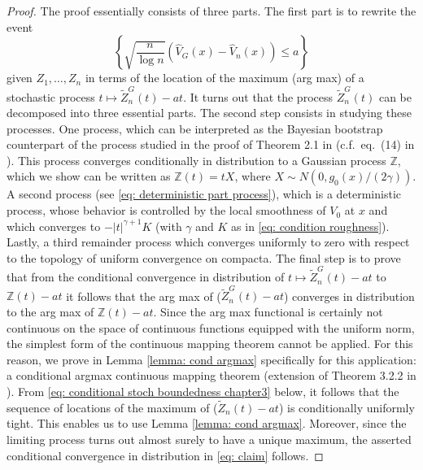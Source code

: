 \begin{proof}

The proof essentially consists of three parts. The first part is to rewrite the event
$$
\left\{\sqrt{\frac{n}{\log n}}\left(\hat{V}_{\scriptscriptstyle{G}}(x) - \hat{V}_n(x)\right) \leq a\right\}
$$
given $Z_1,\ldots,Z_n$ in terms of the location of the maximum (arg max) of a stochastic process $t \mapsto \tilde{Z}^{\scriptscriptstyle{G}}_n(t)-a t$. It turns out that the process $\tilde{Z}^{\scriptscriptstyle{G}}_n(t)$ can be decomposed into three essential parts. The second step consists in studying these processes. One process, which can be interpreted as the Bayesian bootstrap counterpart of the process studied in the proof of Theorem 2.1 in \cite{27} (c.f.\ eq.\ (14) in \cite{27}). This process converges conditionally in distribution to a Gaussian process $\mathbb{Z}$, which we show can be written as $\mathbb{Z}(t) = tX$, where $X \sim N(0,g_0(x)/(2\gamma))$. A second process (see \eqref{eq: deterministic part process}), which is a deterministic process, whose behavior is controlled by the local smoothness of $V_0$ at $x$ and which converges to $- |t|^{\gamma+1} K$ (with $\gamma$ and $K$ as in \eqref{eq: condition roughness}). Lastly, a third remainder process which converges uniformly to zero with respect to the topology of uniform convergence on compacta. The final step is to prove that from the conditional convergence in distribution of $t \mapsto \tilde{Z}^{\scriptscriptstyle{G}}_n(t)-a t$ to $\mathbb{Z}(t)-a t$ it follows that the arg max of ($\tilde{Z}^{\scriptscriptstyle{G}}_n(t)-a t$) converges in distribution to the arg max of $\mathbb{Z}(t)-a t$. Since the arg max functional is certainly not continuous on the space of continuous functions equipped with the uniform norm, the simplest form of the continuous mapping theorem cannot be applied. For this reason, we prove in Lemma \ref{lemma: cond argmax} specifically for this application: a conditional argmax continuous mapping theorem (extension of Theorem 3.2.2 in \cite{5}). From \eqref{eq: conditional stoch boundedness chapter3} below, it follows that the sequence of locations of the maximum of ($\tilde{Z}_n(t)-a t$) is conditionally uniformly tight. This enables us to use Lemma \ref{lemma: cond argmax}. Moreover, since the limiting process turns out almost surely to have a unique maximum, the asserted conditional convergence in distribution in \eqref{eq: claim} follows.



\end{proof}
